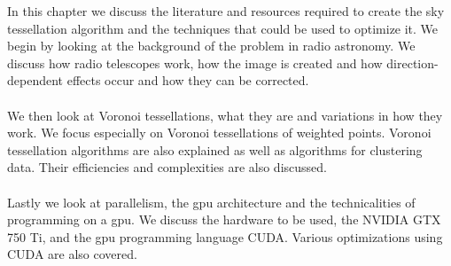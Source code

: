 In this chapter we discuss the literature and resources required to create the sky tessellation algorithm and the techniques that could be used to optimize it. We begin by looking at the background of the problem in radio astronomy. We discuss how radio telescopes work, how the image is created and how direction-dependent effects occur and how they can be corrected.
\\
\\
We then look at Voronoi tessellations, what they are and variations in how they work. We focus especially on Voronoi tessellations of weighted points. Voronoi tessellation algorithms are also explained as well as algorithms for clustering data. Their efficiencies and complexities are also discussed.
\\
\\
Lastly we look at parallelism, the \gls{gpu} architecture and the technicalities of programming on a \gls{gpu}. We discuss the hardware to be used, the NVIDIA GTX 750 Ti, and the \gls{gpu} programming language CUDA. Various optimizations using CUDA are also covered.
